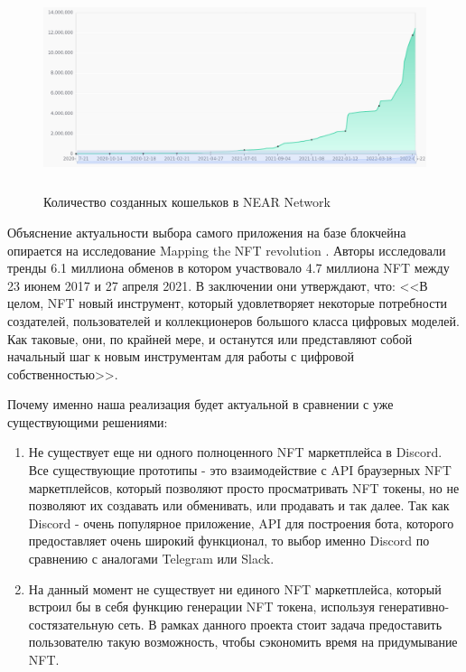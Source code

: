 \begin{figure}[H]
	\centering
	\includegraphics[height=60mm]{fig/near_2.png}
	\caption{Количество созданных кошельков в NEAR Network}
\end{figure}

Объяснение актуальности выбора самого приложения на базе блокчейна опирается на исследование Mapping the NFT revolution \cite{nftrevolution}. Авторы исследовали тренды 6.1 миллиона обменов в котором участвовало 4.7 миллиона NFT между 23 июнем 2017 и 27 апреля 2021. В заключении они утверждают, что: <<В целом, NFT новый инструмент, который удовлетворяет некоторые потребности создателей, пользователей и коллекционеров большого класса цифровых моделей. Как таковые, они, по крайней мере, и останутся или представляют собой начальный шаг к новым инструментам для работы с цифровой собственностью>>.

Почему именно наша реализация будет актуальной в сравнении с уже существующими решениями:


\begin{enumerate}
	\item Не существует еще ни одного полноценного NFT маркетплейса в Discord. Все существующие прототипы - это взаимодействие с API браузерных NFT маркетплейсов, который позволяют просто просматривать NFT токены, но не позволяют их создавать или обменивать, или продавать и так далее.
    Так как Discord - очень популярное приложение, API для построения бота, которого предоставляет очень широкий функционал, то выбор именно Discord по сравнению с аналогами Telegram или Slack.
	\item На данный момент не существует ни единого NFT маркетплейса, который встроил бы в себя функцию генерации NFT токена, используя генеративно-состязательную сеть. В рамках данного проекта стоит задача предоставить пользователю такую возможность, чтобы сэкономить время на придумывание NFT.
\end{enumerate}

